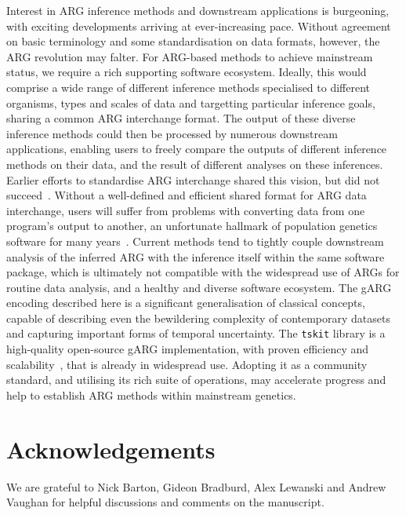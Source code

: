 \documentclass{article}
\begin{document}
Interest in ARG inference methods and downstream applications is
burgeoning, with exciting developments arriving at ever-increasing pace.
Without agreement on basic terminology and some standardisation
on data formats, however, the ARG revolution may falter.
For ARG-based methods to achieve mainstream status, we require
a rich supporting software ecosystem.
Ideally, this would comprise a wide range of different
inference methods specialised to different organisms, types
and scales of data and
targetting particular inference goals, sharing a common ARG interchange format.
The output of these diverse inference methods could then be
processed by numerous downstream applications,
enabling users to freely compare the outputs of different
inference methods on their data, and the result of different
analyses on these inferences.
Earlier efforts to standardise ARG interchange shared this vision,
but did not succeed~\citep{cardona2008extended,mcgill2013graphml}.
Without a well-defined and efficient shared format
for ARG data interchange,
users will suffer from problems with converting data from one program's
output to another, an unfortunate hallmark of population genetics
software for many years~\citep{excoffier2006computer}.
Current methods tend to tightly couple downstream analysis
of the inferred ARG with the inference
itself within the same software package,
which is ultimately not compatible with the widespread use
of ARGs for routine data analysis, and a healthy and diverse software ecosystem.
The gARG encoding described here is a significant generalisation
of classical concepts, capable of describing even the bewildering complexity
of contemporary datasets and capturing important forms of temporal uncertainty.
The \texttt{tskit} library is a high-quality open-source gARG implementation,
with proven efficiency and
scalability~\citep[e.g.][]{anderson2022genes,zhan2023towards},
that is already in widespread use.
Adopting it as a community standard,
and utilising its rich suite of operations,
may accelerate progress and help to
establish ARG methods within mainstream genetics.

\section*{Acknowledgements}
We are grateful to Nick Barton, Gideon Bradburd, Alex Lewanski and Andrew Vaughan
for helpful discussions and comments on the manuscript.
\end{document}
